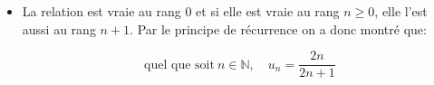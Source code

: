 \documentclass[10pt]{article}
\providecommand{\N}{\mathbb{N}}
\providecommand{\enskip}{\quad}
\begin{document}
\begin{enumerate}
\begin{enumerate}
\begin{itemize}
La relation est vraie au rang $n + 1$.
\item La relation est vraie au rang 0 et si elle est vraie au rang $n \geqslant 0$, elle l'est aussi au rang $n + 1$. Par le principe de récurrence on a donc montré que:

\[\text{quel que soit}\: n \in \N,\enskip u_n=\frac{2n}{2n+1}\]
\end{itemize}
	\end{enumerate}
\end{enumerate}
\end{document}
